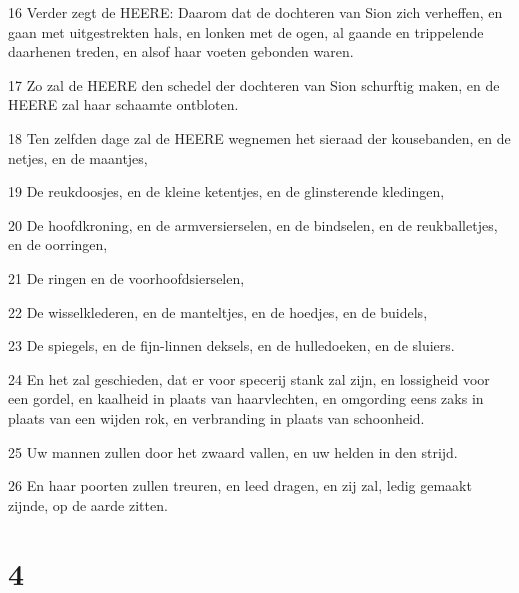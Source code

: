 \par 16 Verder zegt de HEERE: Daarom dat de dochteren van Sion zich verheffen, en gaan met uitgestrekten hals, en lonken met de ogen, al gaande en trippelende daarhenen treden, en alsof haar voeten gebonden waren.
\par 17 Zo zal de HEERE den schedel der dochteren van Sion schurftig maken, en de HEERE zal haar schaamte ontbloten.
\par 18 Ten zelfden dage zal de HEERE wegnemen het sieraad der kousebanden, en de netjes, en de maantjes,
\par 19 De reukdoosjes, en de kleine ketentjes, en de glinsterende kledingen,
\par 20 De hoofdkroning, en de armversierselen, en de bindselen, en de reukballetjes, en de oorringen,
\par 21 De ringen en de voorhoofdsierselen,
\par 22 De wisselklederen, en de manteltjes, en de hoedjes, en de buidels,
\par 23 De spiegels, en de fijn-linnen deksels, en de hulledoeken, en de sluiers.
\par 24 En het zal geschieden, dat er voor specerij stank zal zijn, en lossigheid voor een gordel, en kaalheid in plaats van haarvlechten, en omgording eens zaks in plaats van een wijden rok, en verbranding in plaats van schoonheid.
\par 25 Uw mannen zullen door het zwaard vallen, en uw helden in den strijd.
\par 26 En haar poorten zullen treuren, en leed dragen, en zij zal, ledig gemaakt zijnde, op de aarde zitten.

\chapter{4}

